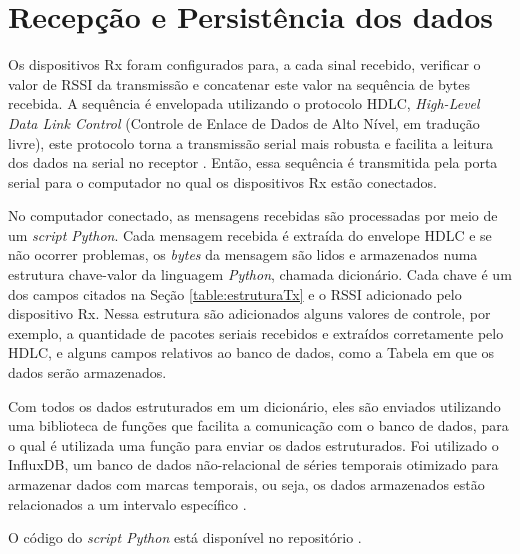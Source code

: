 \section{Recepção e Persistência dos dados}
Os dispositivos Rx foram configurados para, a cada sinal recebido, verificar o valor de RSSI da transmissão e concatenar este valor na sequência de bytes recebida. A sequência é envelopada utilizando o protocolo HDLC, \emph{High-Level Data Link Control} (Controle de Enlace de Dados de Alto Nível, em tradução livre), este protocolo torna a transmissão serial mais robusta e facilita a leitura dos dados na serial no receptor \cite{tanembaum2011}. Então, essa sequência é transmitida pela porta serial para o computador no qual os dispositivos Rx estão conectados.

No computador conectado, as mensagens recebidas são processadas por  meio de um \emph{script Python}. Cada mensagem recebida é extraída do envelope HDLC e se não ocorrer problemas, os \emph{bytes} da mensagem são lidos e armazenados numa estrutura chave-valor da linguagem \emph{Python}, chamada dicionário. Cada chave é um dos campos citados na Seção \ref{table:estruturaTx} e o RSSI adicionado pelo dispositivo Rx. Nessa estrutura são adicionados alguns valores de controle, por exemplo, a quantidade de pacotes seriais recebidos e extraídos corretamente pelo HDLC, e alguns campos relativos ao banco de dados, como a Tabela em que os dados serão armazenados.

Com todos os dados estruturados em um dicionário, eles são enviados utilizando uma biblioteca de funções que facilita a comunicação com o banco de dados, para o qual é utilizada uma função para enviar os dados estruturados. Foi utilizado o InfluxDB, um banco de dados não-relacional de séries temporais otimizado para armazenar dados com marcas temporais, ou seja, os dados armazenados estão relacionados a um intervalo específico \cite{influxData}.

O código do \emph{script Python} está disponível no repositório \cite{openmoteb-serialReader}.


